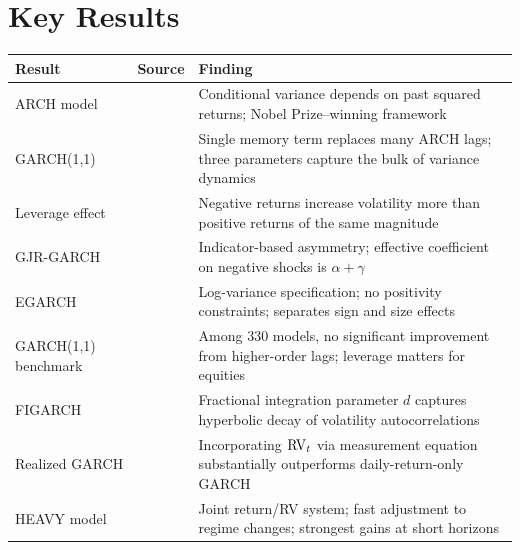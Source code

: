 \section*{Key Results}
\label{sec:garch-key-results}

\begin{center}
\renewcommand{\arraystretch}{1.3}
\begin{tabular}{@{} p{3.5cm} l p{6.5cm} @{}}
\toprule
\textbf{Result} & \textbf{Source} & \textbf{Finding} \\
\midrule
ARCH model
  & \citet{Engle1982}
  & Conditional variance depends on past squared returns;
    Nobel Prize--winning framework \\
GARCH(1,1)
  & \citet{bollerslev1986}
  & Single memory term replaces many ARCH lags;
    three parameters capture the bulk of variance dynamics \\
Leverage effect
  & \citet{Black1976}
  & Negative returns increase volatility more than positive
    returns of the same magnitude \\
GJR-GARCH
  & \citet{gjr1993}
  & Indicator-based asymmetry; effective coefficient on
    negative shocks is $\alpha + \gamma$ \\
EGARCH
  & \citet{nelson1991}
  & Log-variance specification; no positivity constraints;
    separates sign and size effects \\
GARCH(1,1) benchmark
  & \citet{hansen2005forecast}
  & Among 330 models, no significant improvement from
    higher-order lags; leverage matters for equities \\
FIGARCH
  & \citet{baillie1996}
  & Fractional integration parameter $d$ captures
    hyperbolic decay of volatility autocorrelations \\
Realized GARCH
  & \citet{hansen2012realized}
  & Incorporating $\operatorname{RV}_t$ via measurement equation
    substantially outperforms daily-return-only GARCH \\
HEAVY model
  & \citet{shephard2010heavy}
  & Joint return/RV system; fast adjustment to regime
    changes; strongest gains at short horizons \\
\bottomrule
\end{tabular}
\end{center}
